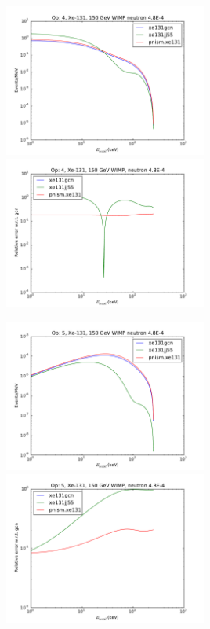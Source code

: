 \documentclass{article}
\begin{document}
\includegraphics[width=0.5\textwidth]{xe131-o4}
\includegraphics[width=0.5\textwidth]{xe131-o4-relerr}

\includegraphics[width=0.5\textwidth]{xe131-o5}
\includegraphics[width=0.5\textwidth]{xe131-o5-relerr}
\end{document}
